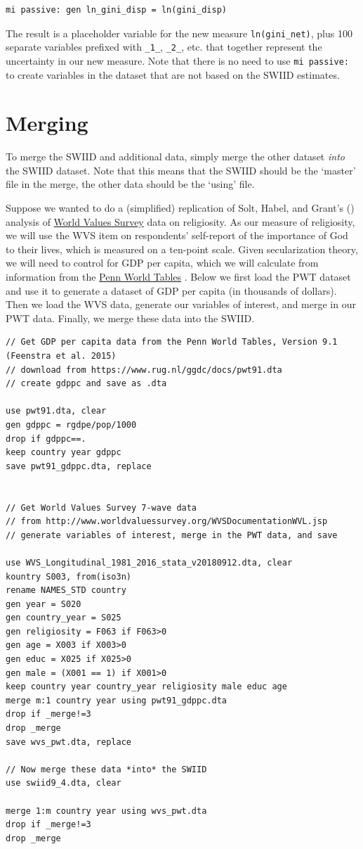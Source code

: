\documentclass[11pt]{article}
\begin{document}
\begin{verbatim}
mi passive: gen ln_gini_disp = ln(gini_disp)
\end{verbatim}

The result is a placeholder variable for the new measure \verb+ln(gini_net)+, plus 100 separate variables prefixed with \verb+_1_+, \verb+_2_+, etc. that together represent the uncertainty in our new measure.  Note that there is no need to use \verb+mi passive:+ to create variables in the dataset that are not based on the SWIID estimates.

\section{Merging}
To merge the SWIID and additional data, simply merge the other dataset \emph{into} the SWIID dataset.  Note that this means that the SWIID should be the `master' file in the merge, the other data should be the `using' file. 

Suppose we wanted to do a (simplified) replication of Solt, Habel, and Grant's (\citeyear{Solt2011a}) analysis of \href{http://worldvaluessurvey.org}{World Values Survey} data on religiosity.  As our measure of religiosity, we will use the WVS item on respondents' self-report of the importance of God to their lives, which is measured on a ten-point scale.  Given secularization theory, we will need to control for GDP per capita, which we will calculate from information from the \href{www.ggdc.net/pwt}{Penn World Tables} \citep{Feenstra2015}.  Below we first load the PWT dataset and use it to generate a dataset of GDP per capita (in thousands of dollars).  Then we load the WVS data, generate our variables of interest, and merge in our PWT data.  Finally, we merge these data into the SWIID.

\begin{verbatim}
// Get GDP per capita data from the Penn World Tables, Version 9.1 (Feenstra et al. 2015)
// download from https://www.rug.nl/ggdc/docs/pwt91.dta
// create gdppc and save as .dta

use pwt91.dta, clear
gen gdppc = rgdpe/pop/1000
drop if gdppc==.
keep country year gdppc
save pwt91_gdppc.dta, replace


// Get World Values Survey 7-wave data 
// from http://www.worldvaluessurvey.org/WVSDocumentationWVL.jsp
// generate variables of interest, merge in the PWT data, and save

use WVS_Longitudinal_1981_2016_stata_v20180912.dta, clear
kountry S003, from(iso3n)
rename NAMES_STD country
gen year = S020
gen country_year = S025 
gen religiosity = F063 if F063>0
gen age = X003 if X003>0
gen educ = X025 if X025>0
gen male = (X001 == 1) if X001>0
keep country year country_year religiosity male educ age
merge m:1 country year using pwt91_gdppc.dta
drop if _merge!=3
drop _merge
save wvs_pwt.dta, replace

// Now merge these data *into* the SWIID
use swiid9_4.dta, clear

merge 1:m country year using wvs_pwt.dta
drop if _merge!=3
drop _merge

\end{verbatim}
\end{document}
